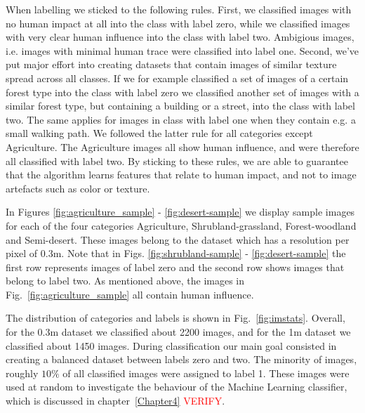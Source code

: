 When labelling we sticked to the following rules. First, we classified images with no human impact at all into the class with label zero,  while we classified images with very clear human influence into the class with label two. Ambigious images, i.e. images with minimal human trace were classified into label one. Second, we've put major effort into creating datasets that contain images of similar texture spread across all classes. If we for example classified a set of images of a certain forest type into the class with label zero we classified another set of images with a similar forest type, but containing a building or a street, into the class with label two. The same applies for images in class with label one when they contain e.g. a small walking path. We followed the latter rule for all categories except Agriculture. The Agriculture images all show human influence, and were therefore all classified with label two. By sticking to these rules, we are able to guarantee that the algorithm learns features that relate to human impact, and not to image artefacts such as color or texture.

In Figures \ref{fig:agriculture_sample} - \ref{fig:desert-sample} we display sample images for each of the four categories Agriculture, Shrubland-grassland, Forest-woodland and Semi-desert. These images belong to the dataset which has a resolution per pixel of 0.3m. Note that in Figs. \ref{fig:shrubland-sample} - \ref{fig:desert-sample} the first row represents images of label zero and the second row shows images that belong to label two. As mentioned above, the images in Fig.~\ref{fig:agriculture_sample} all contain human influence. 

The distribution of categories and labels is shown in Fig.~\ref{fig:imstats}. Overall, for the 0.3m dataset we classified about 2200 images, and for the 1m dataset we classified about 1450 images. During classification our main goal consisted in creating a balanced dataset between labels zero and two. The minority of images, roughly $10\%$ of all classified images were assigned to label 1. These images were used at random to investigate the behaviour of the Machine Learning classifier, which is discussed in chapter~\ref{Chapter4} \textcolor{red}{VERIFY}.

